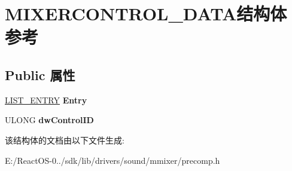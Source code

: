 \hypertarget{struct_m_i_x_e_r_c_o_n_t_r_o_l___d_a_t_a}{}\section{M\+I\+X\+E\+R\+C\+O\+N\+T\+R\+O\+L\+\_\+\+D\+A\+T\+A结构体 参考}
\label{struct_m_i_x_e_r_c_o_n_t_r_o_l___d_a_t_a}
\subsection*{Public 属性}
\begin{DoxyCompactItemize}
\item 
\mbox{\label{struct_m_i_x_e_r_c_o_n_t_r_o_l___d_a_t_a_aeb5ab77545d8e761403d33529690d7aa}} 
\hyperlink{struct___l_i_s_t___e_n_t_r_y}{L\+I\+S\+T\+\_\+\+E\+N\+T\+RY} {\bfseries Entry}
\item 
\mbox{\label{struct_m_i_x_e_r_c_o_n_t_r_o_l___d_a_t_a_a78a27f84787080b8830ba06d058e45f8}} 
U\+L\+O\+NG {\bfseries dw\+Control\+ID}
\end{DoxyCompactItemize}


该结构体的文档由以下文件生成\+:\begin{DoxyCompactItemize}
\item 
E\+:/\+React\+O\+S-\/0../sdk/lib/drivers/sound/mmixer/precomp.\+h\end{DoxyCompactItemize}
